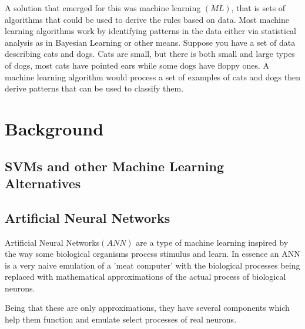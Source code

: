 A solution that emerged for this was machine learning $\left(ML\right)$, that is sets of algorithms that could be used to derive the rules based on data. Most machine learning algorithms work by identifying patterns in the data either via statistical analysis as in Bayesian Learning or other means. Suppose you have a set of data describing cats and dogs. Cats are small, but there is both small and large types of dogs, most cats have pointed ears while some dogs have floppy ones. A machine learning algorithm would process a set of examples of cats and dogs then derive patterns that can be used to classify them.

\section{Background}
\subsection{SVMs and other Machine Learning Alternatives}

\subsection {Artificial Neural Networks}
Artificial Neural Networks$\left(ANN\right)$ are a type of machine learning inspired by the way some biological organisms process stimulus and learn. In essence an ANN is a very naive emulation of a 'meat computer' with the biological processes being replaced with mathematical approximations of the actual process of biological neurons.

Being that these are only approximations, they have several components which help them function and emulate select processes of real neurons.

